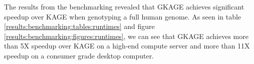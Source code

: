 The results from the benchmarking revealed that GKAGE achieves significant speedup over KAGE when genotyping a full human genome.
As seen in table \ref{results:benchmarking:tables:runtimes} and figure \ref{results:benchmarking:figures:runtimes}, we can see that GKAGE achieves more than 5X speedup over KAGE on a high-end compute server and more than 11X speedup on a consumer grade desktop computer.
